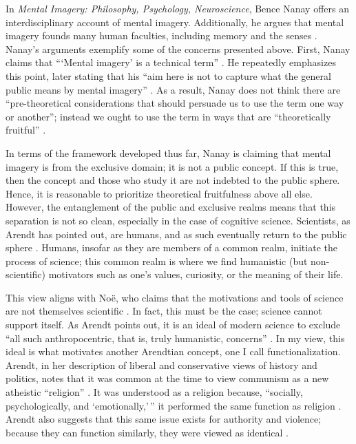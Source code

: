 \documentclass[12pt,letterpaper]{article}
\begin{document}
In \textit{Mental Imagery: Philosophy, Psychology, Neuroscience}, Bence Nanay
offers an interdisciplinary account of mental imagery. Additionally, he argues
that mental imagery founds many human faculties, including memory and the senses
\autocite[viii]{nanayMental2023}. Nanay's arguments exemplify some of the
concerns presented above. First, Nanay claims that {``}`Mental imagery' is a
technical term'' \autocite[3]{nanayMental2023}. He repeatedly emphasizes this
point, later stating that his ``aim here is not to capture what the general
public means by mental imagery'' \autocite[22]{nanayMental2023}. As a result,
Nanay does not think there are ``pre-theoretical considerations that should
persuade us to use the term one way or another''; instead we ought to use the
term in ways that are ``theoretically fruitful'' \autocite[22]{nanayMental2023}.

In terms of the framework developed thus far, Nanay is claiming that mental
imagery is from the exclusive domain; it is not a public concept. If this is
true, then the concept and those who study it are not indebted to the public
sphere. Hence, it is reasonable to prioritize theoretical fruitfulness above all
else. However, the entanglement of the public and exclusive realms means that
this separation is not so clean, especially in the case of cognitive science.
Scientists, as Arendt has pointed out, are humans, and as such eventually return
to the public sphere \autocite[268--269]{arendtFuture1968}. Humans, insofar as
they are members of a common realm, initiate the process of science; this common
realm is where we find humanistic (but non-scientific) motivators such as one's
values, curiosity, or the meaning of their life.

This view aligns with Noë, who claims that the motivations and tools of science
are not themselves scientific \autocite[209]{noeEntanglement2023}. In fact, this
must be the case; science cannot support itself. As Arendt points out, it is an
ideal of modern science to exclude ``all such anthropocentric, that is, truly
humanistic, concerns'' \autocite[266]{arendtFuture1968}. In my view, this ideal
is what motivates another Arendtian concept, one I call functionalization.
Arendt, in her description of liberal and conservative views of history and
politics, notes that it was common at the time to view communism as a new
atheistic ``religion'' \autocite[101--102]{arendtFuture1968}. It was understood
as a religion because, ``socially, psychologically, and `emotionally,'\,'' it
performed the same function as religion \autocite[101--102]{arendtFuture1968}.
Arendt also suggests that this same issue exists for authority and violence;
because they can function similarly, they were viewed as identical
\autocite[103]{arendtFuture1968}.
\end{document}
